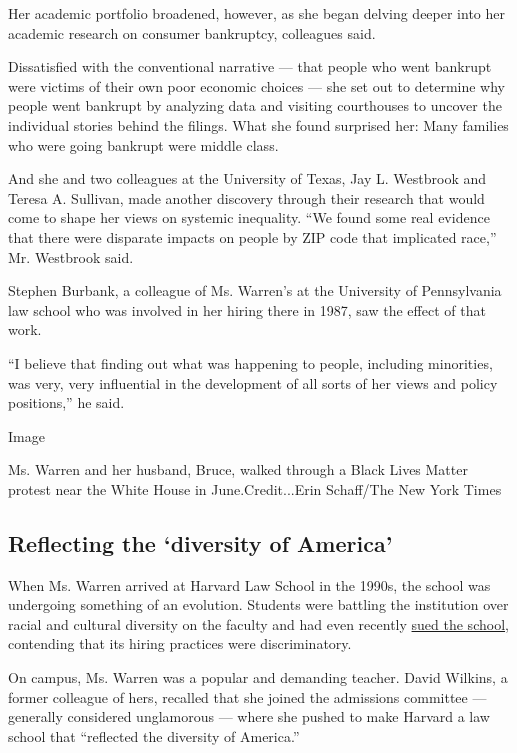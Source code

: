 Her academic portfolio broadened, however, as she began delving deeper
into her academic research on consumer bankruptcy, colleagues said.

Dissatisfied with the conventional narrative --- that people who went
bankrupt were victims of their own poor economic choices --- she set out
to determine why people went bankrupt by analyzing data and visiting
courthouses to uncover the individual stories behind the filings. What
she found surprised her: Many families who were going bankrupt were
middle class.

And she and two colleagues at the University of Texas, Jay L. Westbrook
and Teresa A. Sullivan, made another discovery through their research
that would come to shape her views on systemic inequality. ``We found
some real evidence that there were disparate impacts on people by ZIP
code that implicated race,'' Mr. Westbrook said.

Stephen Burbank, a colleague of Ms. Warren's at the University of
Pennsylvania law school who was involved in her hiring there in 1987,
saw the effect of that work.

``I believe that finding out what was happening to people, including
minorities, was very, very influential in the development of all sorts
of her views and policy positions,'' he said.

Image

Ms. Warren and her husband, Bruce, walked through a Black Lives Matter
protest near the White House in June.Credit...Erin Schaff/The New York
Times

\hypertarget{reflecting-the-diversity-of-america}{%
\subsection{Reflecting the `diversity of
America'}\label{reflecting-the-diversity-of-america}}

When Ms. Warren arrived at Harvard Law School in the 1990s, the school
was undergoing something of an evolution. Students were battling the
institution over racial and cultural diversity on the faculty and had
even recently
\href{https://www.nytimes3xbfgragh.onion/1992/03/06/archives/battling-harvard-law-over-diversity.html}{sued
the school}, contending that its hiring practices were discriminatory.

On campus, Ms. Warren was a popular and demanding teacher. David
Wilkins, a former colleague of hers, recalled that she joined the
admissions committee --- generally considered unglamorous --- where she
pushed to make Harvard a law school that ``reflected the diversity of
America.''

